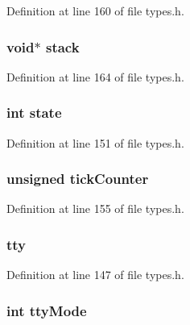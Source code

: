 Definition at line 160 of file types.h.

\hypertarget{structprocess__t_afc0da95553742561773d762fa905fdab}{
\subsubsection[{stack}]{\setlength{\rightskip}{0pt plus 5cm}void$\ast$ {\bf stack}}}
\label{structprocess__t_afc0da95553742561773d762fa905fdab}


Definition at line 164 of file types.h.

\hypertarget{structprocess__t_a89f234133d3efe315836311cbf21c64b}{
\subsubsection[{state}]{\setlength{\rightskip}{0pt plus 5cm}int {\bf state}}}
\label{structprocess__t_a89f234133d3efe315836311cbf21c64b}


Definition at line 151 of file types.h.

\hypertarget{structprocess__t_ae205502dd5c0be67092374ce83267bdf}{
\subsubsection[{tickCounter}]{\setlength{\rightskip}{0pt plus 5cm}unsigned {\bf tickCounter}}}
\label{structprocess__t_ae205502dd5c0be67092374ce83267bdf}


Definition at line 155 of file types.h.

\hypertarget{structprocess__t_af7f414d19241988592fad1bc470e8761}{
\subsubsection[{tty}]{ {\bf tty}}}
\label{structprocess__t_af7f414d19241988592fad1bc470e8761}


Definition at line 147 of file types.h.

\hypertarget{structprocess__t_a5db9aa2a3238730b35b1b99a3932b030}{
\subsubsection[{ttyMode}]{\setlength{\rightskip}{0pt plus 5cm}int {\bf ttyMode}}}
\label{structprocess__t_a5db9aa2a3238730b35b1b99a3932b030}


